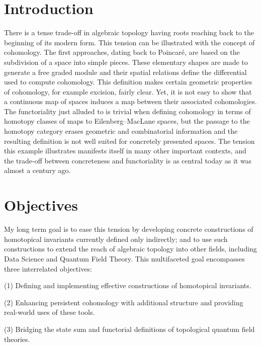 
\section*{Introduction} \label{s:introduction}

There is a tense trade-off in algebraic topology having roots reaching back to the beginning of its modern form.
This tension can be illustrated with the concept of cohomology.
The first approaches, dating back to Poincar\'e, are based on the subdivision of a space into simple pieces.
These elementary shapes are made to generate a free graded module and their spatial relations define the differential used to compute cohomology.
This definition makes certain geometric properties of cohomology, for example excision, fairly clear.
Yet, it is not easy to show that a continuous map of spaces induces a map between their associated cohomologies.
The functoriality just alluded to is trivial when defining cohomology in terms of homotopy classes of maps to Eilenberg--MacLane spaces, but the passage to the homotopy category erases geometric and combinatorial information and the resulting definition is not well suited for concretely presented spaces.
The tension this example illustrates manifests itself in many other important contexts, and the trade-off between concreteness and functoriality is as central today as it was almost a century ago.

\section*{Objectives}

My long term goal is to ease this tension by developing concrete constructions of homotopical invariants currently defined only indirectly; and to use such constructions to extend the reach of algebraic topology into other fields, including Data Science and Quantum Field Theory.
This multifaceted goal encompasses three interrelated objectives:

\smallskip\noindent
(1) Defining and implementing effective constructions of homotopical invariants.\par
\noindent
(2) Enhancing persistent cohomology with additional structure and providing real-world uses of these tools.\par
\noindent
(3) Bridging the state sum and functorial definitions of topological quantum field theories.